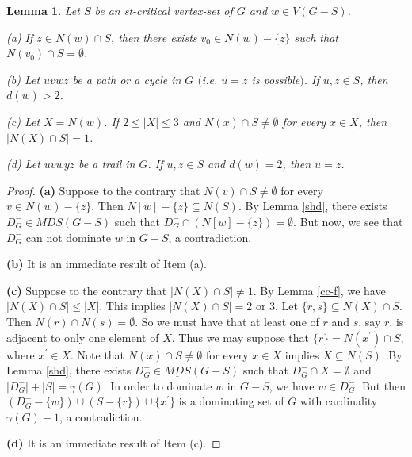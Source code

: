 \documentclass[a4paper,11pt]{article}
\numberwithin{equation}{section}
\newtheorem{lemma}[thm]{Lemma}
\begin{document}
\begin{lemma}\label{y-t}
Let  $S$ be an st-critical vertex-set of $G$ and $w\in V(G-S)$.

\emph{(a)}  If $z\in N(w)\cap S$, then there exists $v_0\in N(w)-\{z\}$ such that $N(v_0)\cap S=\emptyset$.

\emph{(b)} Let $uvwz$ be a path or a cycle in $G$  $($i.e. $u=z$ is possible$)$. If $u,z\in S$, then $d(w)>2$.

\emph{(c)}  Let $X=N(w)$. If $2\leq|X|\leq3$ and $N(x)\cap S\neq\emptyset$ for every $x\in X$, then $|N(X)\cap S|=1$.

\emph{(d)}  Let $uvwyz$ be a trail in $G$. If $u,z\in S$ and $d(w)=2$, then $u=z$.
\end{lemma}
\begin{proof}
\textbf{(a)} Suppose to the contrary that $N(v)\cap S\neq\emptyset$ for every $v\in N(w)-\{z\}$. Then $N[w]-\{z\}\subseteq N(S)$. By Lemma \ref{shd},  there exists $D_G^{-}\in \underline{MDS}(G-S)$ such that  $ D_G^{-}\cap(N[w]-\{z\})=\emptyset$. But now, we see that $D_G^{-}$ can not dominate $w$ in $G-S$, a contradiction.



\textbf{(b)} It is an immediate result of Item (a).


\textbf{(c)}  Suppose to the contrary that $|N(X)\cap S|\neq1$. By Lemma \ref{cc-f}, we have $|N(X)\cap S|\leq|X|$. This implies $|N(X)\cap S|=2$ or $3$. Let $\{r,s\}\subseteq N(X)\cap S$. Then $N(r)\cap N(s)=\emptyset$. So we must have that at least one of $r$ and $s$, say $r$, is adjacent to only one element of $X$. Thus we may suppose that $\{r\}=N(x^{\prime})\cap S$, where $x^{\prime}\in X$. Note that $N(x)\cap S\neq\emptyset$ for every $x\in X$ implies $X\subseteq N(S)$. By Lemma \ref{shd}, there exists $D_G^{-}\in \underline{MDS}(G-S)$ such that $D_G^{-}\cap X=\emptyset$ and $|D_G^{-}|+|S|=\gamma(G)$. In order to dominate $w$ in $G-S$, we have $w\in D_G^{-}$. But then $(D_G^{-}-\{w\})\cup (S-\{r\})\cup\{x^{\prime}\}$ is a dominating set of $G$ with cardinality $\gamma(G)-1$, a contradiction.

\textbf{(d)} It is an immediate result of Item (c).
\end{proof}
\end{document}
